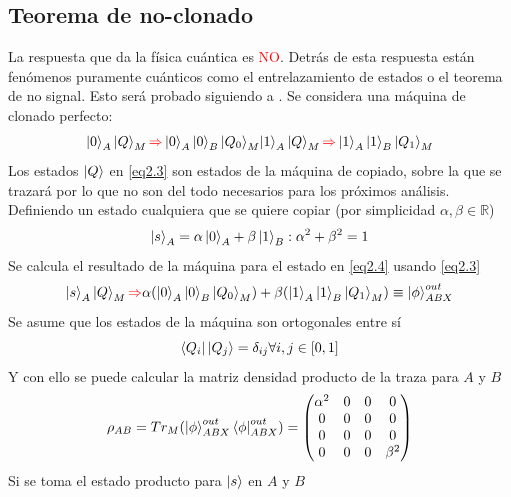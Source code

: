 \documentclass{book}
\begin{document}
\subsection{Teorema de no-clonado}
La respuesta que da la física cuántica es \textcolor{Red}{NO}. Detrás de esta respuesta están fenómenos puramente cuánticos como el entrelazamiento de estados o el teorema de no signal. Esto será probado siguiendo a \textcolor{red}{\cite{bib1}}.
Se considera una máquina de clonado perfecto:
\begin{equation}\label{eq2.3}\begin{aligned}{\ket{0}_A\ket{Q}_M\textcolor{red}{\Rightarrow} \ket{0}_A\ket{0}_B\ket{Q_0}_M} {\ket{1}_A\ket{Q}_M\textcolor{red}{\Rightarrow} \ket{1}_A\ket{1}_B\ket{Q_1}_M}\end{aligned}\end{equation}
Los estados $\ket{Q}$ en \textcolor{blue}{\ref{eq2.3}} son estados de la máquina de copiado, sobre la que se trazará por lo que no son del todo necesarios para los próximos análisis.
Definiendo un estado cualquiera que se quiere copiar (por simplicidad $\alpha, \beta \in \mathbb{R}$)
\begin{equation}\label{eq2.4}{\ket{s}_A=\alpha\ket{0}_A+\beta\ket{1}_B: \alpha^2+\beta^2=1}\end{equation}
Se calcula el resultado de la máquina para el estado en \textcolor{blue}{\ref{eq2.4}} usando \textcolor{blue}{\ref{eq2.3}}
\begin{equation}\label{eq2.5} {\ket{s}_A\ket{Q}_M\textcolor{red}{\Rightarrow}\alpha(\ket{0}_A\ket{0}_B\ket{Q_0}_M)+\beta(\ket{1}_A\ket{1}_B\ket{Q_1}_M)\equiv\ket{\phi}^{out}_{ABX}}\end{equation}
Se asume que los estados de la máquina son ortogonales entre sí
\begin{equation}\label{eq2.6}{\bra{Q_i}\ket{Q_j}=\delta_{ij} \forall i, j \in[0,1]}\end{equation}
Y con ello se puede calcular la matriz densidad producto de la traza para $A$
y $B$
\begin{equation}\label{eq2.7}{\rho_{AB}=Tr_M(\ket{\phi}_{ABX}^{out}\bra{\phi}_{ABX}^{out})=\begin{pmatrix}\alpha^2 & 0 & 0 & 0 \\ 0 & 0 & 0 & 0 \\ 0 & 0 & 0 & 0 \\ 0 & 0 & 0 & \beta^2\end{pmatrix}}\end{equation}
Si se toma el estado producto para $\ket{s}$ en $A$ y $B$
\end{document}
